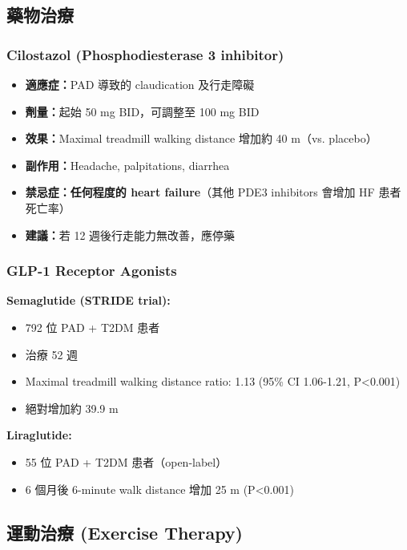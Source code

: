 \documentclass[12pt,a4paper]{article}
\begin{document}
\subsection{藥物治療}

\subsubsection{Cilostazol (Phosphodiesterase 3 inhibitor)}

\begin{itemize}[leftmargin=2em]
    \item \textbf{適應症：}PAD 導致的 claudication 及行走障礙
    \item \textbf{劑量：}起始 50 mg BID，可調整至 100 mg BID
    \item \textbf{效果：}Maximal treadmill walking distance 增加約 40 m（vs. placebo）
    \item \textbf{副作用：}Headache, palpitations, diarrhea
    \item \textbf{禁忌症：}\textcolor{emergency_red}{\textbf{任何程度的 heart failure}}（其他 PDE3 inhibitors 會增加 HF 患者死亡率）
    \item \textbf{建議：}若 12 週後行走能力無改善，應停藥
\end{itemize}

\subsubsection{GLP-1 Receptor Agonists}

\textbf{Semaglutide (STRIDE trial):}
\begin{itemize}[leftmargin=2em]
    \item 792 位 PAD + T2DM 患者
    \item 治療 52 週
    \item Maximal treadmill walking distance ratio: 1.13 (95\% CI 1.06-1.21, P<0.001)
    \item 絕對增加約 39.9 m
\end{itemize}

\textbf{Liraglutide:}
\begin{itemize}[leftmargin=2em]
    \item 55 位 PAD + T2DM 患者（open-label）
    \item 6 個月後 6-minute walk distance 增加 25 m (P<0.001)
\end{itemize}

\subsection{運動治療 (Exercise Therapy)}
\end{document}
